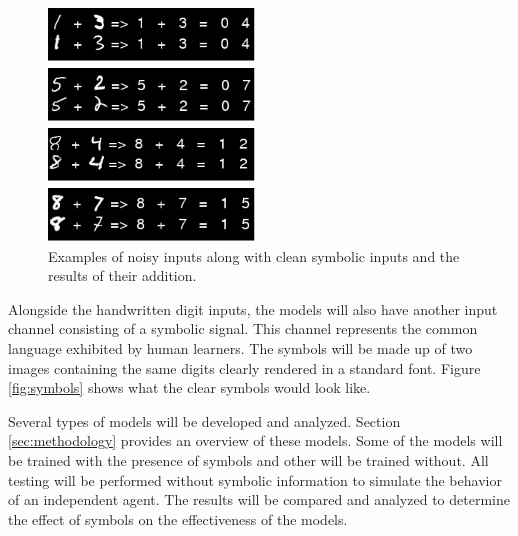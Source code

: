 \documentclass{article}
\begin{document}
	\begin{figure}
		\centering
		\includegraphics[max width=\textwidth]{model-input-output}
		\caption{Examples of noisy inputs along with clean symbolic inputs and the results of their addition.}
		\label{fig:model-input-output}
	\end{figure}
	
	Alongside the handwritten digit inputs, the models will also have another input channel consisting of a symbolic signal. This channel represents the common language exhibited by human learners. The symbols will be made up of two images containing the same digits clearly rendered in a standard font. Figure \ref{fig:symbols} shows what the clear symbols would look like.
	
	Several types of models will be developed and analyzed. Section \ref{sec:methodology} provides an overview of these models. Some of the models will be trained with the presence of symbols and other will be trained without. All testing will be performed without symbolic information to simulate the behavior of an independent agent. The results will be compared and analyzed to determine the effect of symbols on the effectiveness of the models.
	
\end{document}
